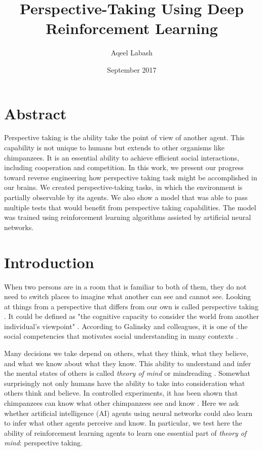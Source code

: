 \documentclass{article}
\title{Perspective-Taking Using Deep Reinforcement Learning}
\author{Aqeel Labash}
\date{September 2017}
\begin{document}
\maketitle
\section{Abstract}
Perspective taking is the ability take the point of view of another agent. This capability is not unique to humans but extends to other organisms like chimpanzees\cite{hare2000chimpanzees}. It is an essential ability to achieve efficient social interactions, including cooperation and competition. In this work, we present our progress toward reverse engineering how perspective taking task might be accomplished in our brains. We created perspective-taking tasks, in which the environment is partially observable by its agents. We also show a model that was able to pass multiple tests that would benefit from perspective taking capabilities. The model was trained using reinforcement learning algorithms assisted by artificial neural networks.

\section{Introduction}
When two persons are in a room that is familiar to both of them, they do not need to switch places to imagine what another can see and cannot see. Looking at things from a perspective that differs from our own is called perspective taking \cite{ryskin2015perspective}. It could be defined as "the cognitive capacity to consider the world from another individual's viewpoint" \cite{davis1983measuring}. According to Galinsky and colleagues, it is one of the social competencies that motivates social understanding in many contexts \cite{galinsky2008pays}.

Many decisions we take depend on others, what they think, what they believe, and what we know about what they know. This ability to understand and infer the mental states of others is called \textit{theory of mind} \cite{premack1978does} or mindreading \cite{apperly2011mindreaders}. Somewhat surprisingly not only humans have the ability to take into consideration what others think and believe. In controlled experiments, it has been shown that chimpanzees can know what other chimpanzees see and know \cite{hare2000chimpanzees}. Here we ask whether artificial intelligence (AI) agents using neural networks could also learn to infer what other agents perceive and know. In particular, we test here the ability of reinforcement learning agents to learn one essential part of \textit{theory of mind}: perspective taking. 
\end{document}
